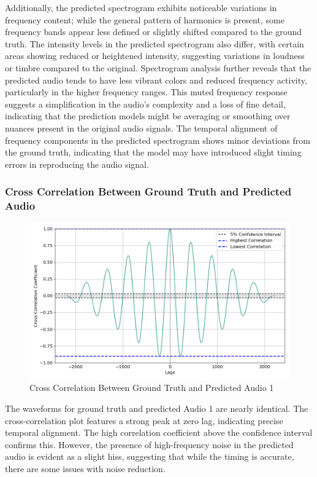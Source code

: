 \documentclass{ioereport}
\begin{document}
    Additionally, the predicted spectrogram exhibits noticeable variations in frequency content; while the general pattern of harmonics is present, some frequency bands appear less defined or slightly shifted compared to the ground truth. The intensity levels in the predicted spectrogram also differ, with certain areas showing reduced or heightened intensity, suggesting variations in loudness or timbre compared to the original. Spectrogram analysis further reveals that the predicted audio tends to have less vibrant colors and reduced frequency activity, particularly in the higher frequency ranges. This muted frequency response suggests a simplification in the audio's complexity and a loss of fine detail, indicating that the prediction models might be averaging or smoothing over nuances present in the original audio signals. The temporal alignment of frequency components in the predicted spectrogram shows minor deviations from the ground truth, indicating that the model may have introduced slight timing errors in reproducing the audio signal.

    \subsubsection{Cross Correlation Between Ground Truth and Predicted Audio}

    \begin{figure}[H]
        \centering
        \includegraphics[width=\linewidth]{assets/crosscorrelation/cross_correlation_puretone100hz.wav_puretone100hzpred.wav.png}
        \caption{Cross Correlation Between Ground Truth and Predicted Audio 1}
        \label{fig:cross-correlation-1}
    \end{figure}
    
    The waveforms for ground truth and predicted Audio 1 are nearly identical. The cross-correlation plot features a strong peak at zero lag, indicating precise temporal alignment. The high correlation coefficient above the confidence interval confirms this. However, the presence of high-frequency noise in the predicted audio is evident as a slight hiss, suggesting that while the timing is accurate, there are some issues with noise reduction.
\end{document}
